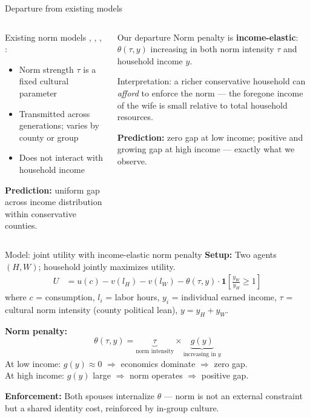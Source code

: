 \documentclass[10pt,aspectratio=169]{beamer}
\begin{document}
\begin{frame}{Departure from existing models}
  \begin{columns}[c]
      \begin{block}{Existing norm models}
        \citet{AkerlofKranton2000}, \citet{FernandezFogliGuner2005},
        \citet{FogliVeldkamp2011}, \citet{BisinVerdier2000}:
        \begin{itemize}
          \item Norm strength $\tau$ is a fixed cultural parameter
          \item Transmitted across generations; varies by county or group
          \item Does not interact with household income
        \end{itemize}
        \textbf{Prediction:} uniform gap across income distribution
        within conservative counties.
      \end{block}
      \begin{alertblock}{Our departure}
        Norm penalty is \textbf{income-elastic}:
        $\theta(\tau, y)$ increasing in both norm intensity $\tau$
        and household income $y$.
        \smallskip

        Interpretation: a richer conservative household can
        \emph{afford} to enforce the norm — the foregone income
        of the wife is small relative to total household resources.
        \smallskip

        \textbf{Prediction:} zero gap at low income; positive and
        growing gap at high income — exactly what we observe.
      \end{alertblock}
  \end{columns}
\end{frame}

\begin{frame}{Model: joint utility with income-elastic norm penalty}
  \textbf{Setup:} Two agents $(H, W)$; household jointly maximizes utility.
  \begin{align*}
    U &= u(c) - v(l_H) - v(l_W) - \theta(\tau, y) \cdot \mathbf{1}\!\left[\frac{y_W}{y_H} \geq 1\right]
  \end{align*}
  where $c$ = consumption, $l_i$ = labor hours, $y_i$ = individual earned income,
  $\tau$ = cultural norm intensity (county political lean), $y = y_H + y_W$.

  \bigskip
  \textbf{Norm penalty:}
  \[
    \theta(\tau, y) = \underbrace{\tau}_{\text{norm intensity}} \times \underbrace{g(y)}_{\text{increasing in }y}
  \]
  At low income: $g(y) \approx 0$ $\Rightarrow$ economics dominate $\Rightarrow$ zero gap. \\
  At high income: $g(y)$ large $\Rightarrow$ norm operates $\Rightarrow$ positive gap.

  \bigskip
  \textbf{Enforcement:} Both spouses internalize $\theta$
  \citep{AkerlofKranton2000} — norm is not an external constraint but a
  shared identity cost, reinforced by in-group culture.
\end{frame}
\end{document}
